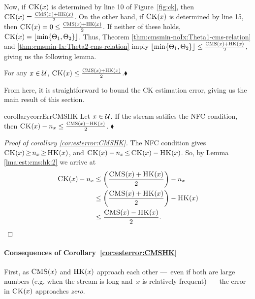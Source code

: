 \noindent
Now, if $\textnormal{\textsc{CK}}(x)$ is determined by line 10 of Figure~\ref{fig:ck}, then $\textnormal{\textsc{CK}}(x) = \frac{\textnormal{\textsc{CMS}}(x) + \textnormal{\textsc{HK}}(x)}{2}$.  On the other hand, if $\textnormal{\textsc{CK}}(x)$ is determined by line 15, then
$\textnormal{\textsc{CK}}(x)= 0 \leq \frac{\textnormal{\textsc{CMS}}(x) + \textnormal{\textsc{HK}}(x)}{2}$.  If neither of these holds, $\CK(x)=\floor(\min \{\Theta_1, \Theta_2\})$. Thus, Theorem \ref{thm:cmsmin-noIx:Theta1-cms-relation} and \ref{thm:cmsmin-Ix:Theta2-cms-relation} imply 
$\floor(\min \{\Theta_1, \Theta_2\}) \leq \frac{\CMS(x) + \HK(x)}{2}$, giving us the following lemma.
\begin{lemma}\label{lma:est:cms:hk:2}For any $x \in \mathcal{U}$, $\textnormal{\textsc{CK}}(x) \leq \frac{\textnormal{\textsc{CMS}}(x) + \textnormal{\textsc{HK}}(x)}{2}$.\hfill$\blacklozenge$
\end{lemma}

\noindent
From here, it is straightforward to bound the CK estimation error, giving us the main result of this section. 
\begin{restatable}{corollary}{corrErrCMSHK}\label{cor:esterror:CMSHK}
	Let $x \in \mathcal{U}$.  If the stream satifies the NFC condition, then $\textnormal{\textsc{CK}}(x) - n_x \leq \frac{\textnormal{\textsc{CMS}}(x) - \textnormal{\textsc{HK}}(x)}{2}$. \hfill$\blacklozenge$
\end{restatable}

\begin{proof}[Proof of corollary \ref{cor:esterror:CMSHK}]
	The NFC condition gives $\textnormal{\textsc{CK}}(x)  \,{\geq}\,  n_x \,{\geq}\,  \textnormal{\textsc{HK}}(x)$, and
	$\textnormal{\textsc{CK}}(x) - n_x \,{\leq}\, \textnormal{\textsc{CK}}(x)- \textnormal{\textsc{HK}}(x)$. So, by Lemma \ref{lma:est:cms:hk:2} we arrive at
\begin{align*}
	\textnormal{\textsc{CK}}(x) - n_x &\leq \left(\frac{\textnormal{\textsc{CMS}}(x) + \textnormal{\textsc{HK}}(x)}{2}\right) - n_x \\
		&\leq \left(\frac{\textnormal{\textsc{CMS}}(x) + \textnormal{\textsc{HK}}(x)}{2}\right) - \textnormal{\textsc{HK}}(x)\\
	&\leq \frac{\textnormal{\textsc{CMS}}(x) - \textnormal{\textsc{HK}}(x)}{2}.
\end{align*}
\end{proof}


\paragraph{Consequences of Corollary~\ref{cor:esterror:CMSHK}}
First, as $\textnormal{\textsc{CMS}}(x)$ and $\textnormal{\textsc{HK}}(x)$ approach each other ---~even if both are large numbers (e.g. when the stream is long and~$x$ is relatively frequent)~--- the error in $\textnormal{\textsc{CK}}(x)$ approaches \emph{zero}.

